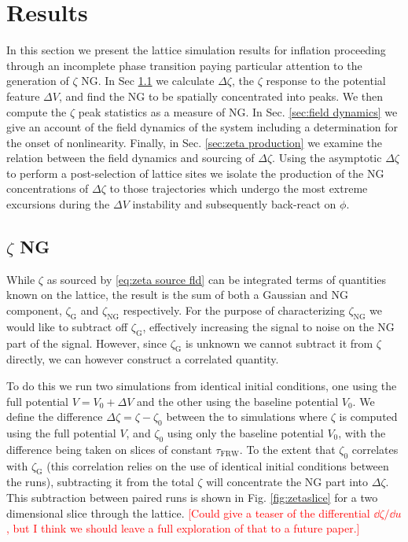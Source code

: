 
\section{Results} \label{sec:results}

In this section we present the lattice simulation results for inflation proceeding through an incomplete phase transition paying particular attention to the generation of $\zeta$ NG. In Sec \ref{sec:zeta ng} we calculate $\Delta\zeta$, the $\zeta$ response to the potential feature $\Delta V$, and find the NG to be spatially concentrated into peaks. We then compute the $\zeta$ peak statistics as a measure of NG. In Sec. \ref{sec:field dynamics} we give an account of the field dynamics of the system including a determination for the onset of nonlinearity. Finally, in Sec. \ref{sec:zeta production} we examine the relation between the field dynamics and sourcing of $\Delta\zeta$. Using the asymptotic $\Delta\zeta$ to perform a post-selection of lattice sites we isolate the production of the NG concentrations of $\Delta\zeta$ to those trajectories which undergo the most extreme excursions during the $\Delta V$ instability and subsequently back-react on $\phi$.


\subsection{$\zeta$ NG} \label{sec:zeta ng}
While $\zeta$ as sourced by \eqref{eq:zeta source fld} can be integrated terms of quantities known on the lattice, the result is the sum of both a Gaussian and NG component, $\zeta_\mathrm{G}$ and $\zeta_\mathrm{NG}$ respectively. For the purpose of characterizing $\zeta_\mathrm{NG}$ we would like to subtract off $\zeta_\mathrm{G}$, effectively increasing the signal to noise on the NG part of the signal. However, since $\zeta_\mathrm{G}$ is unknown we cannot subtract it from $\zeta$ directly, we can however construct a correlated quantity.

To do this we run two simulations from identical initial conditions, one using the full potential $V=V_0+\Delta V$ and the other using the baseline potential $V_0$. We define the difference $\Delta\zeta=\zeta-\zeta_0$ between the to simulations where $\zeta$ is computed using the full potential $V$, and $\zeta_0$ using only the baseline potential $V_0$, with the difference being taken on slices of constant $\tau_\mathrm{FRW}$. To the extent that $\zeta_0$ correlates with $\zeta_\mathrm{G}$ (this correlation relies on the use of identical initial conditions between the runs), subtracting it from the total $\zeta$ will concentrate the NG part into $\Delta\zeta$. This subtraction between paired runs is shown in Fig. \ref{fig:zetaslice} for a two dimensional slice through the lattice. \textcolor{red}{[Could give a teaser of the differential $\dd\zeta/\dd u$, but I think we should leave a full exploration of that to a future paper.]}


